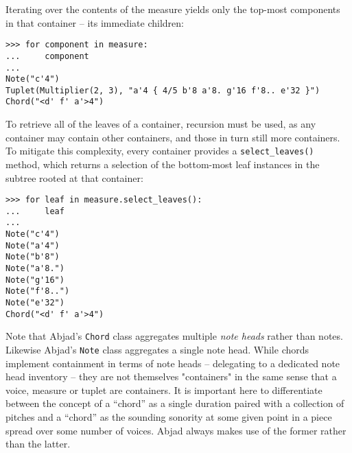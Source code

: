\noindent Iterating over the contents of the  measure yields only
the top-most components in that container -- its immediate children:

\begin{comment}
<abjad>
for component in measure:
    component

</abjad>
\end{comment}

\begin{abjadbookoutput}
\begin{singlespacing}
\vspace{-0.5\baselineskip}
\begin{lstlisting}
>>> for component in measure:
...     component
...
Note("c'4")
Tuplet(Multiplier(2, 3), "a'4 { 4/5 b'8 a'8. g'16 f'8.. e'32 }")
Chord("<d' f' a'>4")
\end{lstlisting}
\end{singlespacing}
\end{abjadbookoutput}

\noindent To retrieve all of the leaves of a container, recursion must be used,
as any container may contain other containers, and those in turn still more
containers. To mitigate this complexity, every container provides a
\texttt{select\_leaves()} method, which returns a selection of the bottom-most
leaf instances in the subtree rooted at that container:

\begin{comment}
<abjad>
for leaf in measure.select_leaves():
    leaf

</abjad>
\end{comment}

\begin{abjadbookoutput}
\begin{singlespacing}
\vspace{-0.5\baselineskip}
\begin{lstlisting}
>>> for leaf in measure.select_leaves():
...     leaf
...
Note("c'4")
Note("a'4")
Note("b'8")
Note("a'8.")
Note("g'16")
Note("f'8..")
Note("e'32")
Chord("<d' f' a'>4")
\end{lstlisting}
\end{singlespacing}
\end{abjadbookoutput}

Note that Abjad's \texttt{Chord} class aggregates multiple \emph{note heads}
rather than notes. Likewise Abjad's \texttt{Note} class aggregates a single
note head. While chords implement containment in terms of note heads --
delegating to a dedicated note head inventory -- they are not themselves
"containers" in the same sense that a voice, measure or tuplet are containers.
It is important here to differentiate between the concept of a \enquote{chord}
as a single duration paired with a collection of pitches and a \enquote{chord}
as the sounding sonority at some given point in a piece spread over some number
of voices. Abjad always makes use of the former rather than the latter.

